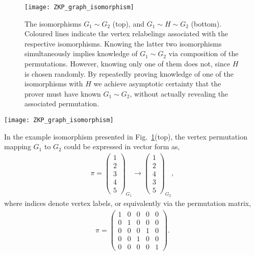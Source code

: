 \doublecol
\begin{figure}[!htpb]
	\texttt{[image: ZKP\_graph\_isomorphism]}
\captionspacefig \caption{The isomorphisms \mbox{$G_1\sim G_2$} (top), and \mbox{$G_1\sim H\sim G_2$} (bottom). Coloured lines indicate the vertex relabelings associated with the respective isomorphisms. Knowing the latter two isomorphisms simultaneously implies knowledge of \mbox{$G_1\sim G_2$} via composition of the permutations. However, knowing only one of them does not, since $H$ is chosen randomly. By repeatedly proving knowledge of one of the isomorphisms with $H$ we achieve asymptotic certainty that the prover must have known \mbox{$G_1\sim G_2$}, without actually revealing the associated permutation.}\label{fig:ZKP_graph}
\end{figure}
\else
\begin{figure*}[!htpb]
	\texttt{[image: ZKP\_graph\_isomorphism]}
\captionspacefig \caption{The isomorphisms \mbox{$G_1\sim G_2$} (top), and \mbox{$G_1\sim H\sim G_2$} (bottom). Coloured lines indicate the vertex relabelings associated with the respective isomorphisms. Knowing the latter two isomorphisms simultaneously implies knowledge of \mbox{$G_1\sim G_2$} via composition of the permutations. However, knowing only one of them does not, since $H$ is chosen randomly. By repeatedly proving knowledge of one of the isomorphisms with $H$ we achieve asymptotic certainty that the prover must have known \mbox{$G_1\sim G_2$}, without actually revealing the associated permutation.}\label{fig:ZKP_graph}
\end{figure*}
\fi

In the example isomorphism presented in Fig.~\ref{fig:ZKP_graph}(top), the vertex permutation mapping $G_1$ to $G_2$ could be expressed in vector form as,
\begin{align}
\pi = \begin{pmatrix}
	1 \\
	2 \\
	3 \\
	4 \\
	5
\end{pmatrix}_{G_1} \to \begin{pmatrix}
	1 \\
	2 \\
	4 \\
	3 \\
	5
\end{pmatrix}_{G_2},
\end{align}
where indices denote vertex labels, or equivalently via the permutation matrix,
\begin{align}
\pi = \begin{pmatrix}
	1 & 0 & 0 & 0 & 0 \\
	0 & 1 & 0 & 0 & 0 \\
	0 & 0 & 0 & 1 & 0 \\
	0 & 0 & 1 & 0 & 0 \\
	0 & 0 & 0 & 0 & 1
\end{pmatrix}.
\end{align}

